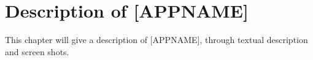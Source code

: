 \chapter{Description of [APPNAME]}
\label{chp:description}

This chapter will give a description of [APPNAME], through textual description and screen shots.

\section{}